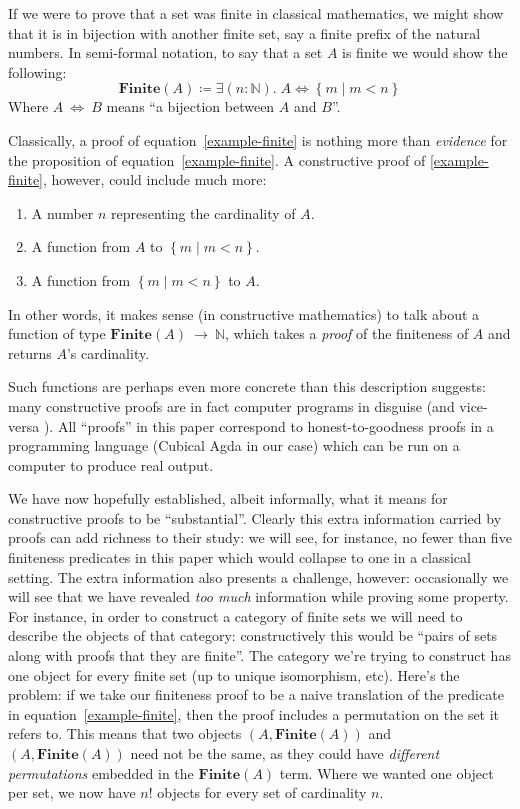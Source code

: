 If we were to prove that a set was finite in classical mathematics, we might
show that it is in bijection with another finite set, say a finite prefix of the
natural numbers.
In semi-formal notation, to say that a set \(A\) is finite we would show the
following:
\begin{equation} \label{example-finite}
  \mathbf{Finite}(A) \coloneqq \exists (n : \mathbb{N}) . \; A \Leftrightarrow \left\{ m \mid m < n\right\}
\end{equation}
Where \(A~\Leftrightarrow~B\) means ``a bijection between \(A\) and \(B\)''.

Classically, a proof of equation~\ref{example-finite} is nothing more than
\emph{evidence} for the proposition of equation~\ref{example-finite}.
A constructive proof of \ref{example-finite}, however, could include much more:
\begin{enumerate}
  \item A number \(n\) representing the cardinality of \(A\).
  \item A function from \(A\) to \(\left\{ m \mid m < n \right\}\).
  \item A function from \(\left\{ m \mid m < n \right\}\) to \(A\).
\end{enumerate}
In other words, it makes sense (in constructive mathematics) to talk about a
function of type \(\mathbf{Finite}(A)~\rightarrow~\mathbb{N}\), which takes a
\emph{proof} of the finiteness of \(A\) and returns \(A\)'s cardinality.

Such functions are perhaps even more concrete than this description suggests:
many constructive proofs are in fact computer programs in disguise (and
vice-versa \cite{wadlerPropositionsTypes2015}).
All ``proofs'' in this paper correspond to honest-to-goodness proofs in a
programming language (Cubical Agda \cite{vezzosiCubicalAgdaDependently2019} in
our case) which can be run on a computer to produce real output.

We have now hopefully established, albeit informally, what it means for
constructive proofs to be ``substantial''.
Clearly this extra information carried by proofs can add richness to their
study: we will see, for instance, no fewer than five finiteness predicates in
this paper which would collapse to one in a classical setting.
The extra information also presents a challenge, however: occasionally we will
see that we have revealed \emph{too much} information while proving some
property.
For instance, in order to construct a category of finite sets we will need to
describe the objects of that category: constructively this would be ``pairs of
sets along with proofs that they are finite''.
The category we're trying to construct has one object for every finite set (up
to unique isomorphism, etc).
Here's the problem: if we take our finiteness proof to be a naive translation of
the predicate in equation~\ref{example-finite}, then the proof includes a
permutation on the set it refers to.
This means that two objects \((A, \mathbf{Finite}(A))\) and \((A,
\mathbf{Finite}(A))\) need not be the same, as they could have \emph{different
  permutations} embedded in the \(\mathbf{Finite}(A)\) term.
Where we wanted one object per set, we now have \(n!\) objects for every set of
cardinality \(n\).

